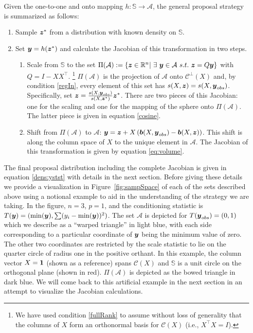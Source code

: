 \documentclass[ba]{imsart}
\newcommand{\by}{\mbox{\boldmath $y$}}
\newcommand{\bz}{\mbox{\boldmath $z$}}
\newcommand{\bb}{\mbox{\boldmath $b$}}
\newcommand{\mc}{\mathcal}
\begin{document}
Given the one-to-one and onto mapping $h: \mathbb{S} \rightarrow \mathcal{A}$, the general proposal strategy is summarized as follows:
\begin{enumerate}
\item Sample $\bz^*$ from a distribution with known density on $\mathbb{S}$.
\item Set $\by = h(\bz^*)$ and calculate the Jacobian of this transformation in two steps.
\begin{enumerate}
\item Scale from $\mathbb{S}$ to the set $\Pi(\mathcal{A}):= \{\bz\in \mathbb{R}^n |\ \exists\ \by\in \mathcal{A}\ s.t.\ \bz=Q \by \}$ with $Q = I - XX^{\top}$. \footnote{We have used condition \ref{fullRank} to assume  without loss of generality  that the columns of $X$ form an orthonormal basis for $\mc{C}(X)$ (i.e., $X^\top X=I$).} $\Pi(\mathcal{A})$ is the projection of $\mathcal{A}$ onto $\mathcal{C}^{\perp}(X)$ and, by condition \ref{regIn}, every element of this set has $s(X, \bz) = s(X, \by_{obs})$. Specifically, set $\bz=\frac{s(X,\boldsymbol{y}_{obs})}{s(X, \boldsymbol{z}^{*})}\bz^{*}$. There are two pieces of this Jacobian: one for the scaling and one for the mapping of the sphere onto $\Pi(\mathcal{A})$. The latter piece is given in equation \eqref{cosine}.
\item Shift  from $\Pi(\mathcal{A})$ to $\mathcal{A}$: $\by=\bz+X\left(\bb(X, \by_{obs})-\bb(X, \bz)\right)$. This shift is along the column space of $X$ to the unique element in $\mathcal{A}$. The Jacobian of this transformation is given by equation \eqref{eq:volume}.
\end{enumerate}
\end{enumerate}
The final proposal distribution including the complete Jacobian is given in equation \eqref{dens:ystst} with details in the next section. Before giving these details we provide a visualization  in Figure~\ref{fig:sampSpace} of each of the sets described above using a notional example to aid in the understanding of the strategy we are taking. In the figure, $n = 3$, $p=1$, and the conditioning statistic is $T(\by)=(\min(\by), \sum (y_i - \min(\by))^2)$. The set $\mathcal{A}$ is depicted for $T(\by_{obs})=(0,1)$ which we describe as a ``warped triangle'' in light blue, with each side corresponding to a particular coordinate of $\by$ being the minimum value of zero. The other two coordinates are restricted by the scale statistic to lie on the quarter circle of radius one in the positive orthant. In this example, the column vector $X=\bf{1}$ (shown as a reference) spans $\mc{C}(X)$  and $\mathbb{S}$ is a unit circle on the orthogonal plane (shown in red). $\Pi(\mathcal{A})$ is depicted as the bowed triangle in dark blue. We will come back to this artificial example in the next section in an attempt to visualize the Jacobian calculations.
\end{document}
